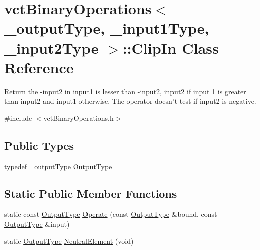 \hypertarget{classvct_binary_operations_1_1_clip_in}{\section{vct\-Binary\-Operations$<$ \-\_\-output\-Type, \-\_\-input1\-Type, \-\_\-input2\-Type $>$\-:\-:Clip\-In Class Reference}
\label{classvct_binary_operations_1_1_clip_in}
}


Return the -\/input2 in input1 is lesser than -\/input2, input2 if input 1 is greater than input2 and input1 otherwise. The operator doesn't test if input2 is negative.  




{\ttfamily \#include $<$vct\-Binary\-Operations.\-h$>$}

\subsection*{Public Types}
\begin{DoxyCompactItemize}
\item 
typedef \-\_\-output\-Type \hyperlink{classvct_binary_operations_1_1_clip_in_ad09cdc8a73a37ea74b60e83b670db658}{Output\-Type}
\end{DoxyCompactItemize}
\subsection*{Static Public Member Functions}
\begin{DoxyCompactItemize}
\item 
static const \hyperlink{classvct_binary_operations_1_1_clip_in_ad09cdc8a73a37ea74b60e83b670db658}{Output\-Type} \hyperlink{classvct_binary_operations_1_1_clip_in_ae382f87132537d0660cb74de43c7f3d3}{Operate} (const \hyperlink{classvct_binary_operations_1_1_clip_in_ad09cdc8a73a37ea74b60e83b670db658}{Output\-Type} \&bound, const \hyperlink{classvct_binary_operations_1_1_clip_in_ad09cdc8a73a37ea74b60e83b670db658}{Output\-Type} \&input)
\item 
static \hyperlink{classvct_binary_operations_1_1_clip_in_ad09cdc8a73a37ea74b60e83b670db658}{Output\-Type} \hyperlink{classvct_binary_operations_1_1_clip_in_ab758c32bbb4a9a69c5ef1e2186d4f222}{Neutral\-Element} (void)
\end{DoxyCompactItemize}


